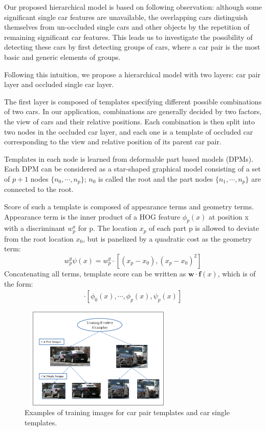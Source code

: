 \documentclass[times, 10pt,twocolumn]{article}
\begin{document}
Our proposed hierarchical model is based on following observation: although some significant single car features are unavailable, the overlapping cars distinguish themselves from un-occluded single cars and other objects by the repetition of remaining significant car features. This leads us to investigate the possibility of detecting these cars by first detecting groups of cars, where a car pair is the most basic and generic elements of groups.


Following this intuition, we propose a hierarchical model with two layers: car pair layer and occluded single car layer.

The first layer is composed of templates specifying different possible combinations of two cars. In our application, combinations are generally decided by two factors, the view of cars and their relative positions.  Each combination is then split into two nodes in the occluded car layer, and each one is a template of occluded car corresponding to the view and relative position of its parent car pair. 

Templates in each node is learned from deformable part based models (DPMs). Each DPM can be considered as a star-shaped graphical model consisting of a set of $p+1$ nodes $\{n_0, \cdots, n_p\}$; $n_0$ is called the root and the part nodes $\{n_1, \cdots , n_p\}$ are connected to the root. 

Score of such a template is composed of appearance terms and geometry terms. Appearance term is the inner product of a HOG \cite{hog} feature $\phi_p (x)$ at position x  with a discriminant $w_p^a$ for p. The location $x_p$ of each part p is allowed to deviate from the root location $x_0$, but is panelized by a quadratic cost as the geometry term:
\begin{equation}
w_p^g \psi(x)=w_p^g \cdot [(x_p-x_0 ),(x_p-x_0 )^2 ]
\end{equation}
Concatenating all terms, template score can be written as $\mathbf{w}\cdot \mathbf{f}(x)$, which is of the form:
\begin{eqnarray}
[w_0^a ,\cdots ,w_p^a ,w_p^g ] \cdot [\phi_0 (x), \cdots ,\phi_p (x) ,\psi_p (x)]
\end{eqnarray}


\begin{figure}
\includegraphics[width=3in, height =1.9in]{./figs/fig2.png}
\caption{Examples of training images for car pair templates and car single templates.}
\label{fig::data}
\end{figure}
\end{document}
